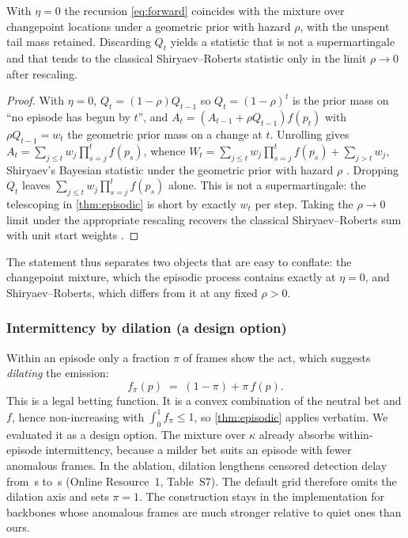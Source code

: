 \begin{proposition}
\label{prop:generalisation}
With $\eta = 0$ the recursion \cref{eq:forward} coincides with the mixture over
changepoint locations under a geometric prior with hazard $\rho$, with the
unspent tail mass retained. Discarding $Q_t$ yields a statistic that is not a
supermartingale and that tends to the classical Shiryaev--Roberts statistic
only in the limit $\rho \to 0$ after rescaling.
\end{proposition}

\begin{proof}
With $\eta = 0$, $Q_t = (1-\rho)Q_{t-1}$ so $Q_t = (1-\rho)^t$ is the prior mass
on ``no episode has begun by $t$'', and
$A_t = (A_{t-1} + \rho Q_{t-1}) f(p_t)$ with $\rho Q_{t-1} = w_t$ the geometric
prior mass on a change at $t$. Unrolling gives
$A_t = \sum_{j \le t} w_j \prod_{s=j}^{t} f(p_s)$, whence
$W_t = \sum_{j\le t} w_j \prod_{s=j}^t f(p_s) + \sum_{j>t} w_j$, Shiryaev's
Bayesian statistic under the geometric prior with hazard $\rho$
\citep{shiryaev1963}. Dropping $Q_t$ leaves $\sum_{j\le t} w_j \prod_{s=j}^t
f(p_s)$ alone. This is not a supermartingale: the telescoping in \cref{thm:episodic} is short by exactly $w_t$ per step. Taking the
$\rho \to 0$ limit under the appropriate rescaling recovers the classical
Shiryaev--Roberts sum with unit start weights \citep{roberts1966}.
\end{proof}

The statement thus separates two objects that are easy to conflate: the changepoint mixture, which the episodic process contains exactly at $\eta=0$, and Shiryaev--Roberts, which differs from it at any fixed $\rho>0$.

\subsubsection{Intermittency by dilation (a design option)}
\label{sec:dilation}

Within an episode only a fraction $\pi$ of frames show the act, which suggests \emph{dilating} the emission:
\begin{equation}
\label{eq:dilated}
  f_\pi(p) \;=\; (1-\pi) + \pi\, f(p).
\end{equation}
This is a legal betting function. It is a convex combination of the neutral bet and $f$, hence non-increasing with $\int_0^1 f_\pi \le 1$, so \cref{thm:episodic} applies verbatim. We evaluated it as a design option. The mixture over $\kappa$ already absorbs within-episode intermittency, because a milder bet suits an episode with fewer anomalous frames. In the ablation, dilation lengthens censored detection delay from \AblFullDelay\,s to \AblDilationDelay\,s (Online Resource~1, Table~S7). The default grid therefore omits the dilation axis and sets $\pi = 1$. The construction stays in the implementation for backbones whose anomalous frames are much stronger relative to quiet ones than ours.

